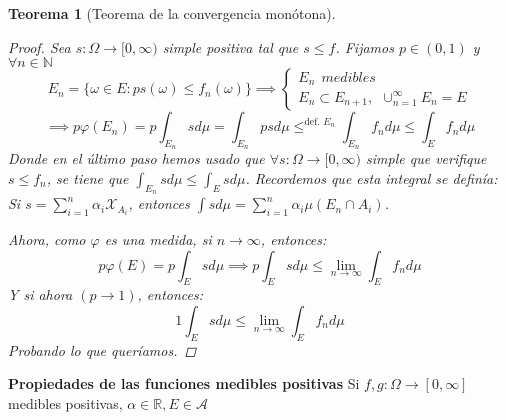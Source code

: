 \documentclass[11pt, a4paper]{article}
\newcommand{\R}{\mathbb{R}}
\theoremstyle{theorem-style}
\newtheorem{nth}{Teorema}[section]
\theoremstyle{definition-style}
\theoremstyle{remark-style}
\theoremstyle{example-style}
\begin{document}
\begin{nth}[Teorema de la convergencia monótona]
\begin{proof}
    Sea $s: \Omega \to [0,\infty)$ simple positiva tal que $s \leq f$. Fijamos $p \in (0,1)$ y $\forall n \in \mathbb{N}$
    \[
      E_n= \{\omega \in E : ps(\omega) \leq f_n(\omega)\}\implies \begin{cases}
	E_n \ \ medibles \\
	E_n \subset E_{n+1}, \ \ \cup_{n=1}^\infty E_n = E
      \end{cases}
    \]
    \[
      \implies p\varphi(E_n) = p \int_{E_n} s d\mu = \int_{E_n} ps d \mu \leq^{\text{def. $E_n$}} \int_{E_n}f_n d\mu \leq \int_E f_n d\mu
    \]
    Donde en el último paso hemos usado que $\forall s:\Omega \to [0,\infty)$ simple que verifique $s\leq f_n$, se tiene que $\int_{E_n}sd\mu \leq \int_E s d \mu$. Recordemos que esta integral se definía:
    Si $s= \sum_{i=1}^n \alpha_i \mathcal{X}_{A_i}$, entonces $\int s d\mu = \sum_{i=1}^n \alpha_i \mu(E_n \cap A_i)$.

    Ahora, como $\varphi$ es una medida, si $n \to \infty$, entonces: 
    $$p \varphi(E) =  p\int_E s d\mu \implies p \int_E sd\mu \leq \lim_{n\to \infty}\int_E f_n d\mu$$
    Y si ahora $(p\to 1)$, entonces:
    \[
      1 \int_E s d\mu \leq \lim_{n\to \infty}\int_E f_n d\mu
    \]
    Probando lo que queríamos.
  \end{proof}
\end{nth}

\textbf{Propiedades de las funciones medibles positivas}
Si $f,g:\Omega \to [0,\infty]$ medibles positivas, $\alpha \in \R, E \in \mathcal{A}$
\end{document}
